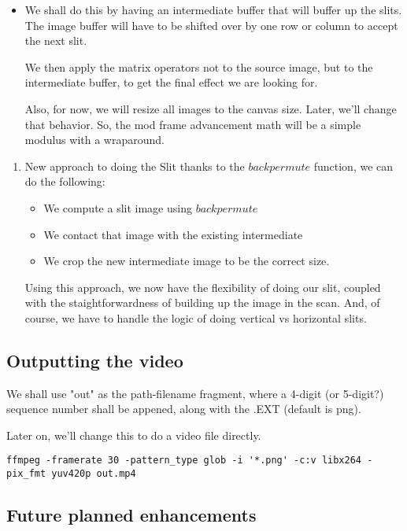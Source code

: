 \documentclass[letterpaper, 11pt]{article}
\begin{document}
\begin{itemize}
\item We shall do this by having an intermediate buffer
that will buffer up the slits. The image buffer
will have to be shifted over by one row or column to 
accept the next slit. 

We then apply the matrix operators not to the source 
image, but to the intermediate buffer, to get the
final effect we are looking for.

Also, for now, we will resize all images to the canvas size.
Later, we'll change that behavior. So, the mod frame advancement
math will be a simple modulus with a wraparound.
\end{itemize}
\begin{enumerate}
\item New approach to doing the Slit
\label{sec:org639427f}
thanks to the \(backpermute\) function, we can do the following:
\begin{itemize}
\item We compute a slit image using \(backpermute\)
\item We contact that image with the existing intermediate
\item We crop the new intermediate image to be the correct size.
\end{itemize}

Using this approach, we now have the flexibility of doing
our slit, coupled with the staightforwardness of building 
up the image in the scan. And, of course, we have to
handle the logic of doing vertical vs horizontal slits.
\end{enumerate}

\subsection{Outputting the video}
\label{sec:orgf474965}
We shall use "out" as the path-filename fragment, where
a 4-digit (or 5-digit?) sequence number shall be appened,
along with the .EXT (default is png).

Later on, we'll change this to do a video file directly. 

\begin{verbatim}
ffmpeg -framerate 30 -pattern_type glob -i '*.png' -c:v libx264 -pix_fmt yuv420p out.mp4
\end{verbatim}


\subsection{Future planned enhancements}
\label{sec:org5a1b90e}
\end{document}
